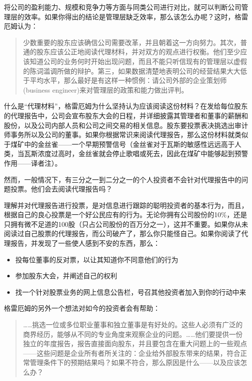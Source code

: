 \documentclass[12pt,oneside]{book}
\begin{document}
将公司的盈利能力、规模和竞争力等方面与同类公司进行对比，就可以判断公司管理层的效率。如果你得出的结论是管理层缺乏效率，那么该怎么办呢？这时，格雷厄姆认为：

\begin{quote}
少数重要的股东应该确信公司需要改革，并且朝着这一方向努力。其次，普通的股东应该公正地阅读代理材料，并对双方的观点进行权衡。他们至少应该知道公司的业务何时开始出现问题，而且不能只听信现有的管理层以虚假的陈词滥调所做的辩护。第三，如果数据清楚地表明公司的经营结果大大低于平均水平，那么最好是有这样一种惯例：请公司外部的企业策划师(business engineer)来对管理层的政策和能力做出评判。
\end{quote}

什么是“代理材料”，格雷厄姆为什么坚持认为应该阅读这份材料？在发给每位股东的代理报告中，公司会宣布股东大会的日程，并详细披露其管理者和董事的薪酬和股份，以及公司内部人员和公司之间交易的相关信息。股东要投票表决挑选出审计师事务所以及公司的董事。如果你根据常识来阅读代理报告，那么这份材料就类似于煤矿中的金丝雀——一个早期预警信号（金丝雀对于瓦斯的敏感性远远高于人类，当瓦斯浓度过高时，金丝雀就会停止歌唱或死去，因此在煤矿中能够起到预警作用——译者注）。

然而，一般情况下，有三分之一到二分之一的个人投资者不会针对代理报告中的问题投票。他们会去阅读代理报告吗？

理解并对代理报告进行投票，是对信息进行跟踪的聪明投资者的基本行为，而且，根据自己的良心投票是一个好公民应有的行为。无论你拥有公司股份的10\%，还是只拥有微不足道的100股（只占公司股份的百万分之一），这并不重要。如果你从未阅读过自己股票的代理报告，而公司破产了，那么你只能怪自己。如果你阅读了代理报告，并发现了一些使人感到不安的东西，那么：

\begin{itemize}
\item 投每位董事的反对票，以让其知道你不同意他们的行为
\item 参加股东大会，并阐述自己的权利
\item 找一个针对股票业务的网上信息公告栏，号召其他投资者加入到你的行动中来
\end{itemize}

格雷厄姆的另外一个想法对如今的投资者会有帮助：

\begin{quote}
……挑选一位或多位职业董事和独立董事是有好处的。这些人必须有广泛的商界经历，能够从不同的专业角度来观察企业的问题。……他们要提供一份独立的年度报告，报告直接面向股东，并且要包含在重大问题上的一些观点——这些问题是企业所有者所关注的：企业给外部股东带来的结果，符合正常管理条件下的预期结果吗？如果不符合，那么原因是什么——以及应该怎么办？
\end{quote}
\end{document}
